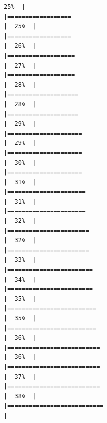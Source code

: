 \documentclass[
  english,
  man,a4paper,mask,floatsintext]{apa6}
\begin{document}
\begin{verbatim}
25%  |                                                                              |==================                                                    |  25%  |                                                                              |==================                                                    |  26%  |                                                                              |===================                                                   |  27%  |                                                                              |===================                                                   |  28%  |                                                                              |====================                                                  |  28%  |                                                                              |====================                                                  |  29%  |                                                                              |=====================                                                 |  29%  |                                                                              |=====================                                                 |  30%  |                                                                              |=====================                                                 |  31%  |                                                                              |======================                                                |  31%  |                                                                              |======================                                                |  32%  |                                                                              |=======================                                               |  32%  |                                                                              |=======================                                               |  33%  |                                                                              |========================                                              |  34%  |                                                                              |========================                                              |  35%  |                                                                              |=========================                                             |  35%  |                                                                              |=========================                                             |  36%  |                                                                              |==========================                                            |  36%  |                                                                              |==========================                                            |  37%  |                                                                              |==========================                                            |  38%  |                                                                              |===========================                                           |  
\end{verbatim}
\end{document}
